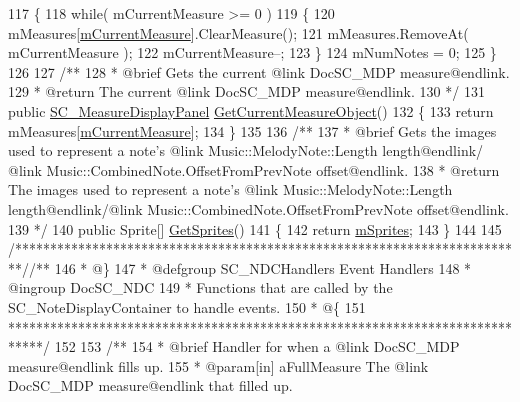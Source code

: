 \begin{DoxyCodeInclude}
117     \{
118         \textcolor{keywordflow}{while}( mCurrentMeasure >= 0 )
119         \{
120             mMeasures[\hyperlink{group___s_c___n_d_c_priv_var_ga28ce2bf8358c9f686b5b9e362aa96dff}{mCurrentMeasure}].ClearMeasure();
121             mMeasures.RemoveAt( mCurrentMeasure );
122             mCurrentMeasure--;
123         \}
124         mNumNotes = 0;
125     \}
126 \textcolor{comment}{}
127 \textcolor{comment}{    /**}
128 \textcolor{comment}{     * @brief Gets the current @link DocSC\_MDP measure@endlink.}
129 \textcolor{comment}{     * @return The current @link DocSC\_MDP measure@endlink.}
130 \textcolor{comment}{    */}
131     \textcolor{keyword}{public} \hyperlink{class_s_c___measure_display_panel}{SC\_MeasureDisplayPanel} \hyperlink{group___s_c___n_d_c_pub_func_ga526a610a4462b164cc91ae7155803ba1}{GetCurrentMeasureObject}()
132     \{
133         \textcolor{keywordflow}{return} mMeasures[\hyperlink{group___s_c___n_d_c_priv_var_ga28ce2bf8358c9f686b5b9e362aa96dff}{mCurrentMeasure}];
134     \}
135 \textcolor{comment}{}
136 \textcolor{comment}{    /**}
137 \textcolor{comment}{     * @brief Gets the images used to represent a note's @link Music::MelodyNote::Length length@endlink/
      @link Music::CombinedNote.OffsetFromPrevNote offset@endlink.}
138 \textcolor{comment}{     * @return The images used to represent a note's @link Music::MelodyNote::Length length@endlink/@link
       Music::CombinedNote.OffsetFromPrevNote offset@endlink.}
139 \textcolor{comment}{    */}
140     \textcolor{keyword}{public} Sprite[] \hyperlink{group___s_c___n_d_c_pub_func_ga3cdbb1068cd6511112c564fc636c56ca}{GetSprites}()
141     \{
142         \textcolor{keywordflow}{return} \hyperlink{group___s_c___n_d_c_priv_var_gac8df613ee0996e999278da2b3f523e34}{mSprites};
143     \}
144 
145     \textcolor{comment}{/*************************************************************************/}\textcolor{comment}{/** }
146 \textcolor{comment}{    * @\}}
147 \textcolor{comment}{    * @defgroup SC\_NDCHandlers Event Handlers}
148 \textcolor{comment}{    * @ingroup DocSC\_NDC}
149 \textcolor{comment}{    * Functions that are called by the SC\_NoteDisplayContainer to handle events.}
150 \textcolor{comment}{    * @\{}
151 \textcolor{comment}{    *****************************************************************************/}
152 \textcolor{comment}{}
153 \textcolor{comment}{    /**}
154 \textcolor{comment}{     * @brief Handler for when a @link DocSC\_MDP measure@endlink fills up.}
155 \textcolor{comment}{     * @param[in] aFullMeasure The @link DocSC\_MDP measure@endlink that filled up.}

\end{DoxyCodeInclude}
